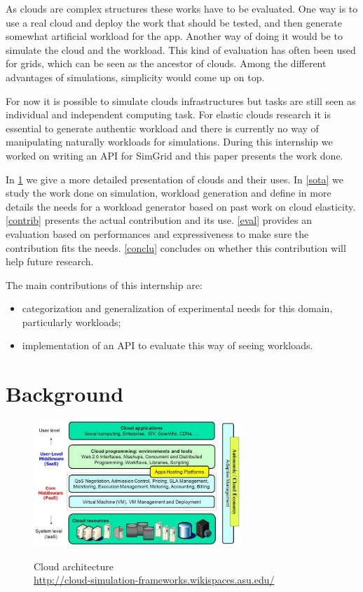 \documentclass[a4paper, onecolumn]{article}
\begin{document}
  As clouds are complex structures these works have to be evaluated. One way is
  to use a real cloud and deploy the work that should be tested, and then
  generate somewhat artificial workload for the app. Another way of doing it
  would be to simulate the cloud and the workload. This kind of evaluation has
  often been used for grids, which can be seen as the ancestor of clouds. Among
  the different advantages of simulations, simplicity would come up on top.
  
  For now it is possible to simulate clouds infrastructures but tasks are still
  seen as individual and independent computing task. For elastic clouds research
  it is essential to generate authentic workload and there is currently no way
  of manipulating naturally workloads for simulations. During this internship we
  worked on writing an API for SimGrid and this paper presents the work done.
  
  In \ref{background} we give a more detailed presentation of clouds and their 
  uses. In \ref{sota} we study the work done on simulation, workload generation 
  and define in more details the needs for a workload generator based on past 
  work on cloud elasticity. \ref{contrib} presents the actual contribution and 
  its use. \ref{eval} provides an evaluation based on performances and 
  expressiveness to make sure the contribution fits the needs. \ref{conclu} 
  concludes on whether this contribution will help future research.
  
  The main contributions of this internship are:
  \begin{itemize}
  	\item categorization and generalization of experimental needs for this 
  	domain, particularly workloads;
  	\item implementation of an API to evaluate this way of seeing workloads.
  \end{itemize}


\section{Background} \label{background}
  \begin{figure}
    \caption{Cloud architecture \\ 
    \url{http://cloud-simulation-frameworks.wikispaces.asu.edu/}}
    \centering
    \includegraphics[width=0.7\textwidth]{../plots/cloud_architecture}
    \label{cloud_arch}
  \end{figure}
  
\end{document}
